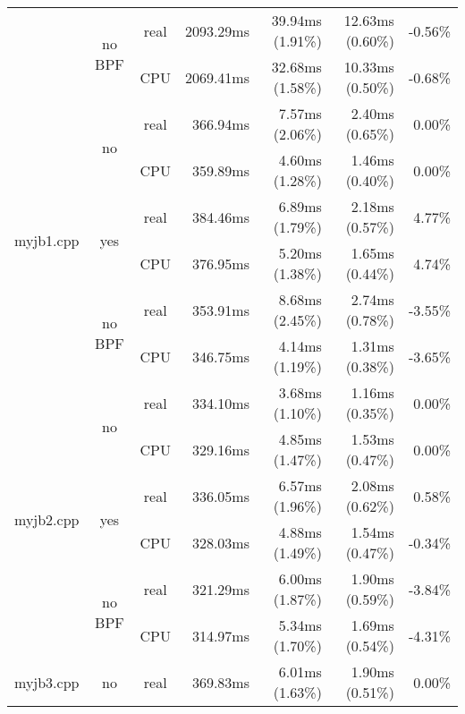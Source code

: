 \documentclass[en]{pracamgr}
\begin{document}
\begin{appendices}
\begin{small}
\begin{longtable}{|l|c|c|r|r|r|r|}
                            \cline{2-7}
                            & \multirow{2}{*}{no BPF} & real & 2093.29ms & 39.94ms (1.91\%) & 12.63ms (0.60\%) & -0.56\% \\*
                            &                         & CPU  & 2069.41ms & 32.68ms (1.58\%) & 10.33ms (0.50\%) & -0.68\% \\
\hline
\multirow{6}{*}{myjb1.cpp}  & \multirow{2}{*}{no}     & real & 366.94ms & 7.57ms (2.06\%) & 2.40ms (0.65\%) & 0.00\% \\*
                            &                         & CPU  & 359.89ms & 4.60ms (1.28\%) & 1.46ms (0.40\%) & 0.00\% \\*
                            \cline{2-7}
                            & \multirow{2}{*}{yes}    & real & 384.46ms & 6.89ms (1.79\%) & 2.18ms (0.57\%) & 4.77\% \\*
                            &                         & CPU  & 376.95ms & 5.20ms (1.38\%) & 1.65ms (0.44\%) & 4.74\% \\*
                            \cline{2-7}
                            & \multirow{2}{*}{no BPF} & real & 353.91ms & 8.68ms (2.45\%) & 2.74ms (0.78\%) & -3.55\% \\*
                            &                         & CPU  & 346.75ms & 4.14ms (1.19\%) & 1.31ms (0.38\%) & -3.65\% \\
\hline
\multirow{6}{*}{myjb2.cpp}  & \multirow{2}{*}{no}     & real & 334.10ms & 3.68ms (1.10\%) & 1.16ms (0.35\%) & 0.00\% \\*
                            &                         & CPU  & 329.16ms & 4.85ms (1.47\%) & 1.53ms (0.47\%) & 0.00\% \\*
                            \cline{2-7}
                            & \multirow{2}{*}{yes}    & real & 336.05ms & 6.57ms (1.96\%) & 2.08ms (0.62\%) & 0.58\% \\*
                            &                         & CPU  & 328.03ms & 4.88ms (1.49\%) & 1.54ms (0.47\%) & -0.34\% \\*
                            \cline{2-7}
                            & \multirow{2}{*}{no BPF} & real & 321.29ms & 6.00ms (1.87\%) & 1.90ms (0.59\%) & -3.84\% \\*
                            &                         & CPU  & 314.97ms & 5.34ms (1.70\%) & 1.69ms (0.54\%) & -4.31\% \\
\hline
\multirow{6}{*}{myjb3.cpp}  & \multirow{2}{*}{no}     & real & 369.83ms & 6.01ms (1.63\%) & 1.90ms (0.51\%) & 0.00\% \\*

\end{longtable}
\end{small}
\end{appendices}
\end{document}
